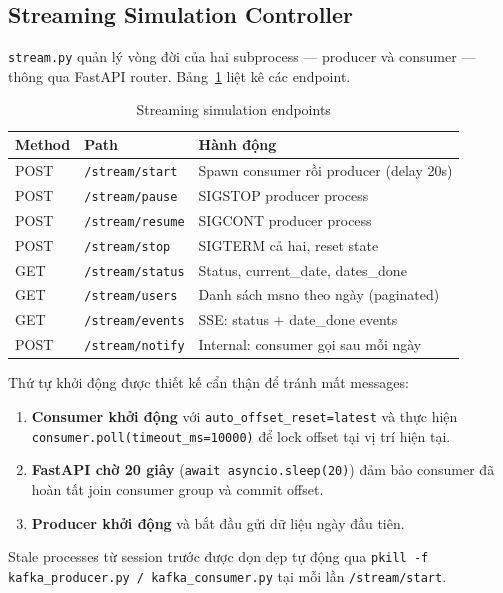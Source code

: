 \documentclass[conference]{IEEEtran}
\begin{document}
\subsection{Streaming Simulation Controller}

\texttt{stream.py} quản lý vòng đời của hai subprocess — producer và consumer
— thông qua FastAPI router. Bảng~\ref{tab:stream_endpoints} liệt kê các endpoint.

\begin{table}[htbp]
\caption{Streaming simulation endpoints}
\label{tab:stream_endpoints}
\centering
\begin{tabular}{lll}
\toprule
\textbf{Method} & \textbf{Path} & \textbf{Hành động} \\
\midrule
POST & \texttt{/stream/start}   & Spawn consumer rồi producer (delay 20s) \\
POST & \texttt{/stream/pause}   & SIGSTOP producer process \\
POST & \texttt{/stream/resume}  & SIGCONT producer process \\
POST & \texttt{/stream/stop}    & SIGTERM cả hai, reset state \\
GET  & \texttt{/stream/status}  & Status, current\_date, dates\_done \\
GET  & \texttt{/stream/users}   & Danh sách msno theo ngày (paginated) \\
GET  & \texttt{/stream/events}  & SSE: status + date\_done events \\
POST & \texttt{/stream/notify}  & Internal: consumer gọi sau mỗi ngày \\
\bottomrule
\end{tabular}
\end{table}

Thứ tự khởi động được thiết kế cẩn thận để tránh mất messages:

\begin{enumerate}
  \item \textbf{Consumer khởi động} với \texttt{auto\_offset\_reset=latest}
        và thực hiện \texttt{consumer.poll(timeout\_ms=10000)} để lock offset
        tại vị trí hiện tại.
  \item \textbf{FastAPI chờ 20 giây} (\texttt{await asyncio.sleep(20)}) đảm
        bảo consumer đã hoàn tất join consumer group và commit offset.
  \item \textbf{Producer khởi động} và bắt đầu gửi dữ liệu ngày đầu tiên.
\end{enumerate}

Stale processes từ session trước được dọn dẹp tự động qua
\texttt{pkill -f kafka\_producer.py / kafka\_consumer.py} tại mỗi lần
\texttt{/stream/start}.
\end{document}
